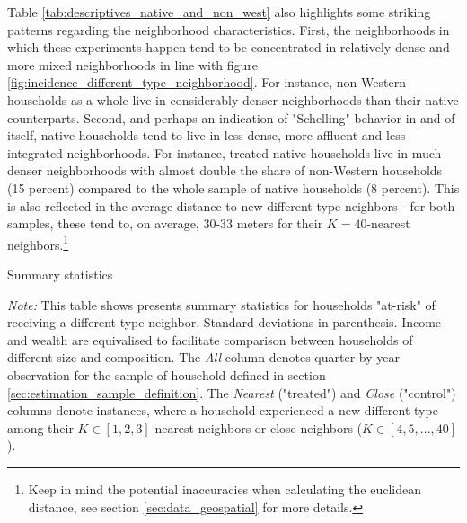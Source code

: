 \documentclass[main.tex]{subfiles}
\begin{document}
Table \ref{tab:descriptives_native_and_non_west} also highlights some striking patterns regarding the neighborhood characteristics. First, the neighborhoods in which these experiments happen tend to be concentrated in relatively dense and more mixed neighborhoods in line with figure \ref{fig:incidence_different_type_neighborhood}. For instance, non-Western households as a whole live in considerably denser neighborhoods than their native counterparts. Second, and perhaps an indication of "Schelling" behavior in and of itself, native households tend to live in less dense, more affluent and less-integrated neighborhoods. For instance, treated native households live in much denser neighborhoods with almost double the share of non-Western households (15 percent) compared to the whole sample of native households (8 percent). This is also reflected in the average distance to new different-type neighbors - for both samples, these tend to, on average, 30-33 meters for their $K=40$-nearest neighbors.\footnote{Keep in mind the potential inaccuracies when calculating the euclidean distance, see section \ref{sec:data_geospatial} for more details.}
\begin{table}[H]
    \centering
    \caption{Summary statistics}
    \resizebox{\textwidth}{!}{}
    \label{tab:descriptives_native_and_non_west}
\begin{tablenotes}[flushleft]
\item \scriptsize \textit{Note:} This table shows presents summary statistics for households "at-risk" of receiving a different-type neighbor. Standard deviations in parenthesis. Income and wealth are equivalised to facilitate comparison between households of different size and composition. The \textit{All} column denotes quarter-by-year observation for the sample of household defined in section \ref{sec:estimation_sample_definition}. The \textit{Nearest} ("treated") and \textit{Close} ("control") columns denote instances, where a household experienced a new different-type among their $K\in [1,2,3]$ nearest neighbors or close neighbors ($K\in [4, 5, ...,40]$).
\end{tablenotes}
\end{table}
\end{document}
